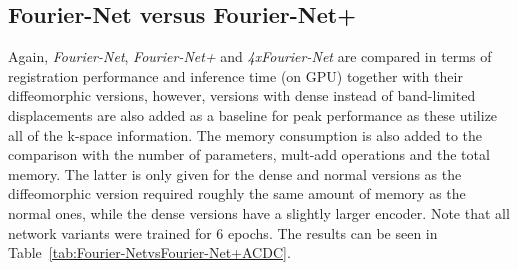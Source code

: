 \documentclass[english,version-2022-01]{uzl-thesis} %
\begin{document}
\subsection{Fourier-Net versus Fourier-Net+} \label{SubSec:ResultsFourier-NetvsFourier-Net+ACDC}
Again, \emph{Fourier-Net}, \emph{Fourier-Net+} and \emph{4xFourier-Net} are compared in terms of registration performance and inference time (on GPU) together with their diffeomorphic versions, however, versions with dense instead of band-limited displacements are also added as a baseline for peak performance as these utilize all of the k-space information. The memory consumption is also added to the comparison with the number of parameters, mult-add operations and the total memory. The latter is only given for the dense and normal versions as the diffeomorphic version required roughly the same amount of memory as the normal ones, while the dense versions have a slightly larger encoder. 
Note that all network variants were trained for 6 epochs. The results can be seen in Table~\ref{tab:Fourier-NetvsFourier-Net+ACDC}.
\end{document}
